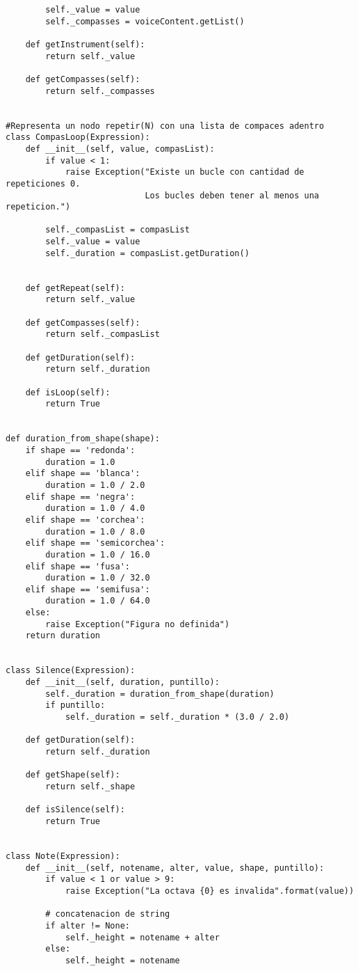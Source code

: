 \begin{verbatim}
        self._value = value
        self._compasses = voiceContent.getList()

    def getInstrument(self):
        return self._value

    def getCompasses(self):
        return self._compasses


#Representa un nodo repetir(N) con una lista de compaces adentro
class CompasLoop(Expression):
    def __init__(self, value, compasList):
        if value < 1:
            raise Exception("Existe un bucle con cantidad de repeticiones 0. 
                            Los bucles deben tener al menos una repeticion.")

        self._compasList = compasList
        self._value = value
        self._duration = compasList.getDuration()


    def getRepeat(self):
        return self._value

    def getCompasses(self):
        return self._compasList

    def getDuration(self):
        return self._duration

    def isLoop(self):
        return True


def duration_from_shape(shape):
    if shape == 'redonda':
        duration = 1.0
    elif shape == 'blanca':
        duration = 1.0 / 2.0
    elif shape == 'negra':
        duration = 1.0 / 4.0
    elif shape == 'corchea':
        duration = 1.0 / 8.0
    elif shape == 'semicorchea':
        duration = 1.0 / 16.0
    elif shape == 'fusa':
        duration = 1.0 / 32.0
    elif shape == 'semifusa':
        duration = 1.0 / 64.0
    else:
        raise Exception("Figura no definida")
    return duration


class Silence(Expression):
    def __init__(self, duration, puntillo):
        self._duration = duration_from_shape(duration)
        if puntillo:
            self._duration = self._duration * (3.0 / 2.0)

    def getDuration(self):
        return self._duration

    def getShape(self):
        return self._shape

    def isSilence(self):
        return True


class Note(Expression):
    def __init__(self, notename, alter, value, shape, puntillo):
        if value < 1 or value > 9:
            raise Exception("La octava {0} es invalida".format(value))

        # concatenacion de string
        if alter != None:
            self._height = notename + alter
        else:
            self._height = notename


\end{verbatim}

